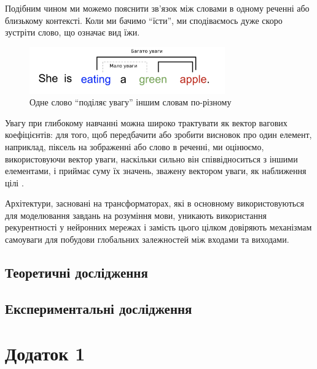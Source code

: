 \documentclass[a4paper,14pt]{extreport}
\newcommand\chap[1]{%
  \chapter*{#1}%
  \addcontentsline{toc}{chapter}{\uppercase{#1}}}
\begin{document}
Подібним чином ми можемо пояснити зв'язок між словами в одному реченні
або близькому контексті. Коли ми бачимо ``їсти'', ми сподіваємось дуже
скоро зустріти слово, що означає вид їжи.

\begin{figure}[H]
    \centering
    \includegraphics[width=0.75\textwidth]{sentence-example-attention.png}
    \caption{Одне слово ``поділяє увагу'' іншим словам по-різному}
    \label{fig:attend-example}
\end{figure}

Увагу при глибокому навчанні можна широко трактувати як вектор вагових
коефіцієнтів: для того, щоб передбачити або зробити висновок про один елемент,
наприклад, піксель на зображенні або слово в реченні, ми оцінюємо,
використовуючи вектор уваги, наскільки сильно він співвідноситься з іншими
елементами,
і приймає суму їх значень, зважену вектором уваги, як наближення
цілі \cite{attention}.

Архітектури, засновані на трансформаторах, які в основному
використовуються для моделювання завдань на розуміння мови,
уникають використання рекурентності у нейронних мережах і замість
цього цілком довіряють механізмам самоуваги для побудови
глобальних залежностей між входами та виходами.

\section{Теоретичні дослідження}


\section{Експериментальні дослідження}


\newpage


\newpage
\chap{Додаток 1}

    

\end{document}
